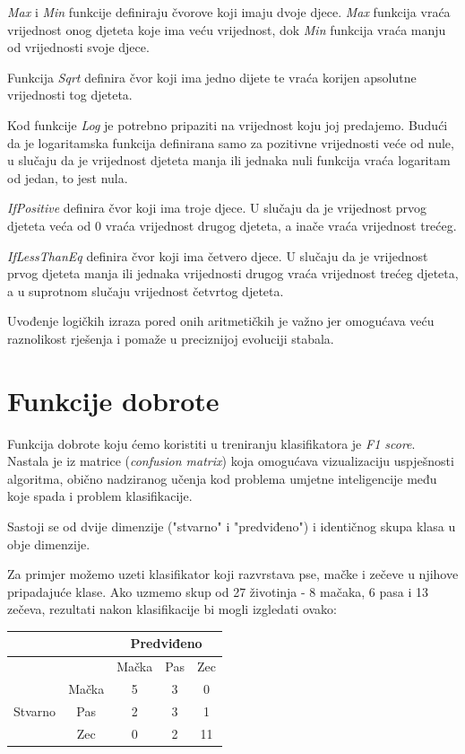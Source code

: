 \documentclass[times, utf8, zavrsni]{fer}
\begin{document}
\textit{Max} i \textit{Min} funkcije definiraju čvorove koji imaju dvoje djece. \textit{Max} funkcija vraća vrijednost onog djeteta koje ima veću vrijednost, dok \textit{Min} funkcija vraća manju od vrijednosti svoje djece.


Funkcija \textit{Sqrt} definira čvor koji ima jedno dijete te vraća korijen apsolutne vrijednosti tog djeteta.

Kod funkcije \textit{Log} je potrebno pripaziti na vrijednost koju joj predajemo. Budući da je logaritamska funkcija definirana samo za pozitivne vrijednosti veće od nule, u slučaju da je vrijednost djeteta manja ili jednaka nuli funkcija vraća logaritam od jedan, to jest nula.

\textit{IfPositive} definira čvor koji ima troje djece. U slučaju da je vrijednost prvog djeteta veća od 0 vraća vrijednost drugog djeteta, a inače vraća vrijednost trećeg.


\textit{IfLessThanEq} definira čvor koji ima četvero djece. U slučaju da je vrijednost prvog djeteta manja ili jednaka vrijednosti drugog vraća vrijednost trećeg djeteta, a u suprotnom slučaju vrijednost četvrtog djeteta.

Uvođenje logičkih izraza pored onih aritmetičkih je važno jer omogućava veću raznolikost rješenja i pomaže u preciznijoj evoluciji stabala. 

\section{Funkcije dobrote}

Funkcija dobrote koju ćemo koristiti u treniranju klasifikatora je \textit{F1 score}. Nastala je iz matrice (\textit{confusion matrix}) koja omogućava vizualizaciju uspješnosti algoritma, obično nadziranog učenja kod problema umjetne inteligencije među koje spada i problem klasifikacije.

Sastoji se od dvije dimenzije ("stvarno" i "predviđeno") i identičnog skupa klasa u obje dimenzije. 

Za primjer možemo uzeti klasifikator koji razvrstava pse, mačke i zečeve u njihove pripadajuće klase. Ako uzmemo skup od 27 životinja - 8 mačaka, 6 pasa i 13 zečeva, rezultati nakon klasifikacije bi mogli izgledati ovako:

\begin{center}
\begin{tabular}{|c|c|c|c|c|}
\hline
& & \multicolumn{3}{|c|}{Predviđeno} \\
\hline
& & Mačka & Pas & Zec \\
\hline
\multirow{3}{4em}{Stvarno} & Mačka & 5 & 3 & 0 \\

& Pas & 2 & 3 & 1 \\

& Zec & 0 & 2 & 11 \\
\hline

\end{tabular}
\end{center}
\end{document}
